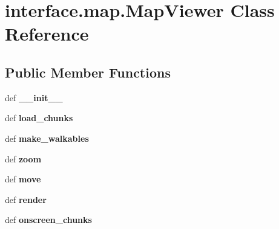 \hypertarget{classinterface_1_1map_1_1_map_viewer}{\section{interface.\-map.\-Map\-Viewer \-Class \-Reference}
\label{classinterface_1_1map_1_1_map_viewer}
}
\subsection*{\-Public \-Member \-Functions}
\begin{DoxyCompactItemize}
\item 
\hypertarget{classinterface_1_1map_1_1_map_viewer_adbed7cbe4a6078d5bc3cd8232990e0b3}{def {\bfseries \-\_\-\-\_\-init\-\_\-\-\_\-}}\label{classinterface_1_1map_1_1_map_viewer_adbed7cbe4a6078d5bc3cd8232990e0b3}

\item 
\hypertarget{classinterface_1_1map_1_1_map_viewer_a950c4e78dd52d72f05578fbc907f55c3}{def {\bfseries load\-\_\-chunks}}\label{classinterface_1_1map_1_1_map_viewer_a950c4e78dd52d72f05578fbc907f55c3}

\item 
\hypertarget{classinterface_1_1map_1_1_map_viewer_ab1a87ccdc662aa25e277c145811f35e1}{def {\bfseries make\-\_\-walkables}}\label{classinterface_1_1map_1_1_map_viewer_ab1a87ccdc662aa25e277c145811f35e1}

\item 
\hypertarget{classinterface_1_1map_1_1_map_viewer_a6627b670006580b8a0bd0a3400100e2c}{def {\bfseries zoom}}\label{classinterface_1_1map_1_1_map_viewer_a6627b670006580b8a0bd0a3400100e2c}

\item 
\hypertarget{classinterface_1_1map_1_1_map_viewer_ae77159080d71d007d22a7ca876ebddb5}{def {\bfseries move}}\label{classinterface_1_1map_1_1_map_viewer_ae77159080d71d007d22a7ca876ebddb5}

\item 
\hypertarget{classinterface_1_1map_1_1_map_viewer_a79d3cd7b3210dfb15781d42f2954f08a}{def {\bfseries render}}\label{classinterface_1_1map_1_1_map_viewer_a79d3cd7b3210dfb15781d42f2954f08a}

\item 
\hypertarget{classinterface_1_1map_1_1_map_viewer_a003c479abb34df98d252344fa28e3f5b}{def {\bfseries onscreen\-\_\-chunks}}\label{classinterface_1_1map_1_1_map_viewer_a003c479abb34df98d252344fa28e3f5b}


\end{DoxyCompactItemize}
